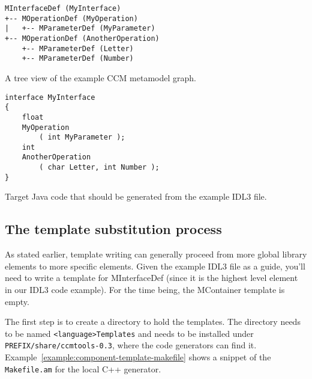 \begin{Example}
\begin{minifbox}
\begin{small}
\begin{verbatim}
MInterfaceDef (MyInterface)
+-- MOperationDef (MyOperation)
|   +-- MParameterDef (MyParameter)
+-- MOperationDef (AnotherOperation)
    +-- MParameterDef (Letter)
    +-- MParameterDef (Number)
\end{verbatim}
\end{small}
\end{minifbox}
\caption{A tree view of the example CCM metamodel graph.}
\label{example:component-parse-tree}
\end{Example}

\begin{Example}
\begin{minifbox}
\begin{small}
\begin{verbatim}
interface MyInterface
{
    float
    MyOperation
        ( int MyParameter );
    int
    AnotherOperation
        ( char Letter, int Number );
}
\end{verbatim}
\end{small}
\end{minifbox}
\caption{Target Java code that should be generated from the example IDL3 file.}
\label{example:component-generated-java}
\end{Example}

\subsection{The template substitution process}

As stated earlier, template writing can generally proceed from more global
library elements to more specific elements. Given the example IDL3 file as a
guide, you'll need to write a template for MInterfaceDef (since it is the
highest level element in our IDL3 code example). For the time being, the
MContainer template is empty.

The first step is to create a directory to hold the templates. The directory
needs to be named {\tt <language>Templates} and needs to be installed under {\tt
PREFIX/share/ccmtools-0.3}, where the code generators can find it.
Example~\ref{example:component-template-makefile} shows a snippet of the {\tt
Makefile.am} for the local C++ generator.

